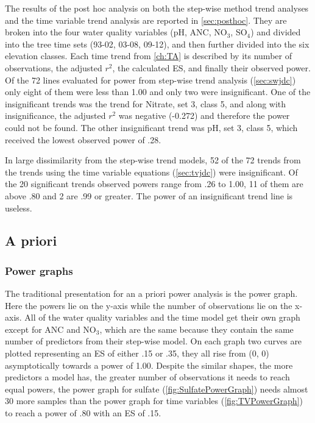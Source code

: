 The results of the post hoc analysis on both the step-wise method trend analyses and the time variable trend analysis are reported in \autoref{sec:posthoc}.
They are broken into the four water quality variables (pH, ANC, NO$_3$, SO$_4$) and divided into the tree time sets (93-02, 03-08, 09-12), and then further divided into the six elevation classes.
Each time trend from \autoref{ch:TA} is described by its number of observations, the adjusted $r^2$, the calculated ES, and finally their observed power.
Of the 72 lines evaluated for power from step-wise trend analysis (\autoref{sec:swjdc}) only eight of them were less than 1.00 and only two were insignificant.
One of the insignificant trends was the trend for Nitrate, set 3, class 5, and along with insignificance, the adjusted $r^2$ was negative (-0.272) and therefore the power could not be found.
The other insignificant trend was pH, set 3, class 5, which received the lowest observed power of .28.

In large dissimilarity from the step-wise trend models, 52 of the 72 trends from the trends using the time variable equations (\autoref{sec:tvjdc}) were insignificant.
Of the 20 significant trends observed powers range from .26 to 1.00, 11 of them are above .80 and 2 are .99 or greater.
The power of an insignificant trend line is useless.

\subsection{A priori}\label{sec:apriori}

\subsubsection{Power graphs}

The traditional presentation for an a priori power analysis is the power graph.
Here the powers  lie on the y-axis while the number of observations lie on the x-axis.
All of the water quality variables and the time model get their own graph except for ANC and NO$_3$, which are the same because they contain the same number of predictors from their step-wise model.
On each graph two curves are plotted representing an ES of either .15 or .35, they all rise from (0, 0) asymptotically towards a power of 1.00.
Despite the similar shapes, the more predictors a model has, the greater number of  observations it needs to reach equal powers, the power graph for sulfate (\autoref{fig:SulfatePowerGraph}) needs almost 30 more samples than the power graph for time variables (\autoref{fig:TVPowerGraph}) to reach a power of .80 with an ES of .15.

